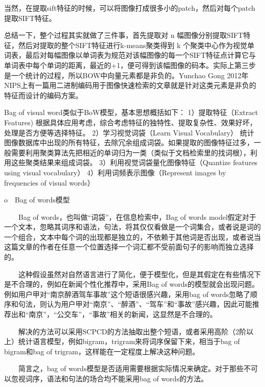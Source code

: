 \documentclass[10pt,a4paper]{ctexbook}
\begin{document}
 

当然，在提取sift特征的时候，可以将图像打成很多小的patch，然后对每个patch提取SIFT特征。

 

总结一下，整个过程其实就做了三件事，首先提取对  n  幅图像分别提取SIFT特征，然后对提取的整个SIFT特征进行k-means聚类得到  k  个聚类中心作为视觉单词表，最后对每幅图像以单词表为规范对该幅图像的每一个SIFT特征点计算它与单词表中每个单词的距离，最近的+1，便可得到该幅图像的码本。实际上第三步是一个统计的过程，所以BOW中向量元素都是非负的。Yunchao Gong 2012年NIPS上有一篇用二进制编码用于图像快速检索的文章就是针对这类元素是非负的特征而设计的编码方案。




 Bag of visual word类似于BoW模型，基本思想概括如下：
 1）提取特征（Extract Features)
 根据具体应用考虑，综合考虑特征的独特性、提取复杂性、效果好坏，处理是否方便等选择特征。
 2）学习视觉词袋（Learn Visual Vocabulary）
 统计图像数据库中出现的所有特征，去除冗余组成词袋。如果提取的图像特征过多，一般需要利用聚类算法先把相近的单词归为一类（类似于文档检索里的找词根），利用这些聚类结果来组成词袋。
 3）利用视觉词袋量化图像特征（Quantize features using visual vocabulary）
 4）利用词频表示图像（Represent images by frequencies of visual words）




o　Bag of words模型 

　　Bag of words，也叫做“词袋”，在信息检索中，Bag of words model假定对于一个文本，忽略其词序和语法，句法，将其仅仅看做是一个词集合，或者说是词的一个组合，文本中每个词的出现都是独立的，不依赖于其他词是否出现，或者说当这篇文章的作者在任意一个位置选择一个词汇都不受前面句子的影响而独立选择的。 

　　这种假设虽然对自然语言进行了简化，便于模型化，但是其假定在有些情况下是不合理的，例如在新闻个性化推荐中，采用Bag of words的模型就会出现问题。例如用户甲对“南京醉酒驾车事故”这个短语很感兴趣，采用bag of words忽略了顺序和句法，则认为用户甲对“南京”、“醉酒”、“驾车”和“事故”感兴趣，因此可能推荐出和“南京”，“公交车”，“事故”相关的新闻，这显然是不合理的。 

　　解决的方法可以采用SCPCD的方法抽取出整个短语，或者采用高阶（2阶以上）统计语言模型，例如bigram，trigram来将词序保留下来，相当于bag of bigram和bag of trigram，这样能在一定程度上解决这种问题。 

　　简言之，bag of words模型是否适用需要根据实际情况来确定。对于那些不可以忽视词序，语法和句法的场合均不能采用bag of words的方法。
\end{document}
